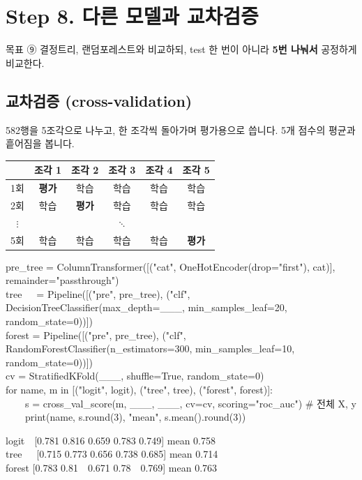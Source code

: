 \documentclass[11pt,a4paper]{article}
\begin{document}
\section{Step 8. 다른 모델과 교차검증}
\begin{goalbox}{목표 \quad ⑨}
결정트리, 랜덤포레스트와 비교하되, test 한 번이 아니라 \textbf{5번 나눠서} 공정하게 비교한다.
\end{goalbox}

\subsection{교차검증 (cross-validation)}
582행을 5조각으로 나누고, 한 조각씩 돌아가며 평가용으로 씁니다. 5개 점수의 평균과 흩어짐을 봅니다.
\begin{center}\small
\begin{tabular}{@{}c c c c c c@{}}
\toprule
 & 조각 1 & 조각 2 & 조각 3 & 조각 4 & 조각 5 \\
\midrule
1회 & \textbf{평가} & 학습 & 학습 & 학습 & 학습 \\
2회 & 학습 & \textbf{평가} & 학습 & 학습 & 학습 \\
$\vdots$ & & & $\ddots$ & & \\
5회 & 학습 & 학습 & 학습 & 학습 & \textbf{평가} \\
\bottomrule
\end{tabular}
\end{center}

\begin{codebox}
pre\_tree = ColumnTransformer([("cat", OneHotEncoder(drop="first"), cat)], remainder="passthrough")\\
tree\ \ \ = Pipeline([("pre", pre\_tree), ("clf", DecisionTreeClassifier(max\_depth=\_\_\_, min\_samples\_leaf=20, random\_state=0))])\\
forest = Pipeline([("pre", pre\_tree), ("clf", RandomForestClassifier(n\_estimators=300, min\_samples\_leaf=10, random\_state=0))])\\
cv = StratifiedKFold(\_\_\_, shuffle=True, random\_state=0)\\
for name, m in [("logit", logit), ("tree", tree), ("forest", forest)]:\\
\ \ \ \ s = cross\_val\_score(m, \_\_\_, \_\_\_, cv=cv, scoring="roc\_auc") \hfill \# 전체 X, y\\
\ \ \ \ print(name, s.round(3), "mean", s.mean().round(3))
\end{codebox}
\begin{outbox}
logit\ \ [0.781 0.816 0.659 0.783 0.749] mean 0.758\\
tree\ \ \ [0.715 0.773 0.656 0.738 0.685] mean 0.714\\
forest [0.783 0.81\ \ 0.671 0.78\ \ 0.769] mean 0.763
\end{outbox}
\end{document}
